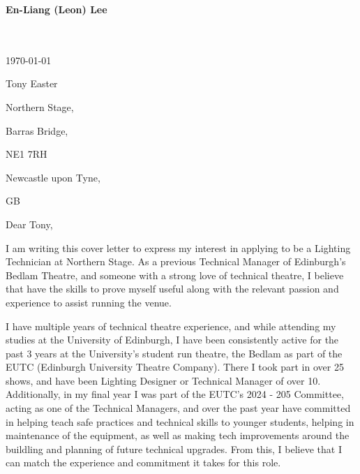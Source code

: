 \documentclass[10pt,english]{article}
\begin{document}
\setlength{\columnsep}{2.2em}
\setlength{\columnseprule}{4pt}



\newpage

\setlength{\columnsep}{2.2em}
\setlength{\columnseprule}{4pt}

\begin{minipage}[c][2.5cm][c]{1\mpwidth}
	\LARGE{\textbf{\textcolor{maincol}{En-Liang (Leon) Lee}}} \\[2pt]
	\normalsize{}\\
	\\
\end{minipage}

\bigskip

\begin{minipage}[c][2.5cm][c]{1\mpwidth}
	\today
	\bigskip

	Tony Easter

	Northern Stage,

	Barras Bridge,

	NE1 7RH

	Newcastle upon Tyne,

	GB
\end{minipage}
\bigskip\bigskip

Dear Tony,
\medskip

I am writing this cover letter to express my interest in applying to be a Lighting Technician at Northern Stage. As a previous Technical Manager of Edinburgh's Bedlam Theatre, and someone with a strong love of technical theatre, I believe that have the skills to prove myself useful along with the relevant passion and experience to assist running the venue.

\medskip

I have multiple years of technical theatre experience, and while attending my studies at the University of Edinburgh, I have been consistently active for the past 3 years at the University's student run theatre, the Bedlam as part of the EUTC (Edinburgh University Theatre Company). There I took part in over 25 shows, and have been Lighting Designer or Technical Manager of over 10. Additionally, in my final year I was part of the EUTC's 2024 - 205 Committee, acting as one of the Technical Managers, and over the past year have committed in helping teach safe practices and technical skills to younger students, helping in maintenance of the equipment, as well as making tech improvements around the buildling and planning of future technical upgrades. From this, I believe that I can match the experience and commitment it takes for this role. 
\end{document}
